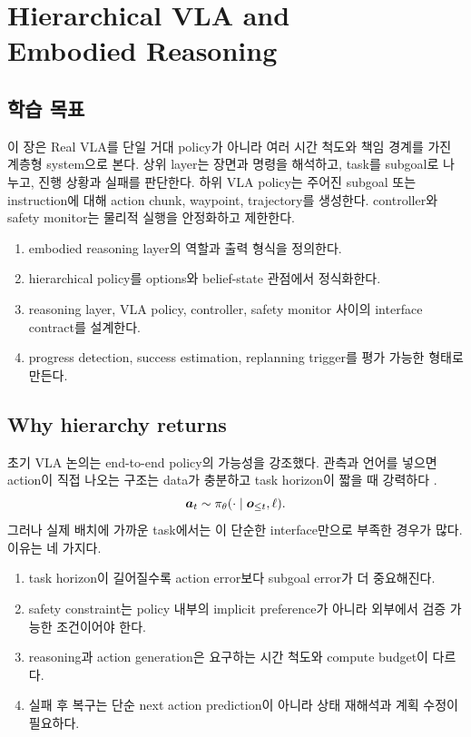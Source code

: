 \chapter[Hierarchical VLA and Embodied Reasoning]{Hierarchical VLA and\\Embodied Reasoning}

\section*{학습 목표}

이 장은 Real VLA를 단일 거대 policy가 아니라 여러 시간 척도와 책임 경계를 가진 계층형 system으로 본다. 상위 layer는 장면과 명령을 해석하고, task를 subgoal로 나누고, 진행 상황과 실패를 판단한다. 하위 VLA policy는 주어진 subgoal 또는 instruction에 대해 action chunk, waypoint, trajectory를 생성한다. controller와 safety monitor는 물리적 실행을 안정화하고 제한한다.

\begin{enumerate}
  \item embodied reasoning layer의 역할과 출력 형식을 정의한다.
  \item hierarchical policy를 options와 belief-state 관점에서 정식화한다.
  \item reasoning layer, VLA policy, controller, safety monitor 사이의 interface contract를 설계한다.
  \item progress detection, success estimation, replanning trigger를 평가 가능한 형태로 만든다.
\end{enumerate}

\section{Why hierarchy returns}

초기 VLA 논의는 end-to-end policy의 가능성을 강조했다. 관측과 언어를 넣으면 action이 직접 나오는 구조는 data가 충분하고 task horizon이 짧을 때 강력하다 \cite{rt12022,openvla2024,pi02024}.
\begin{equation}
  \bm{a}_t
  \sim
  \pi_{\theta}
  (\cdot \mid \bm{o}_{\leq t}, \ell).
  \label{eq:ch17-monolithic-policy}
\end{equation}
그러나 실제 배치에 가까운 task에서는 이 단순한 interface만으로 부족한 경우가 많다. 이유는 네 가지다.
\begin{enumerate}
  \item task horizon이 길어질수록 action error보다 subgoal error가 더 중요해진다.
  \item safety constraint는 policy 내부의 implicit preference가 아니라 외부에서 검증 가능한 조건이어야 한다.
  \item reasoning과 action generation은 요구하는 시간 척도와 compute budget이 다르다.
  \item 실패 후 복구는 단순 next action prediction이 아니라 상태 재해석과 계획 수정이 필요하다.
\end{enumerate}

